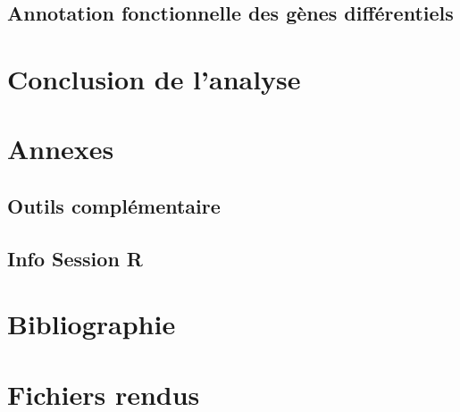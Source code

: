 \documentclass[a4paper]{article}
\begin{document}
%

\par
\subsection{Annotation fonctionnelle des gènes différentiels}

\section{Conclusion de l'analyse}

\newpage
\appendix
\section{Annexes}
\subsection{Outils complémentaire}


\subsection{Info Session R}

\section{Bibliographie}
{}

\newpage
\section{Fichiers rendus}

\end{document}
